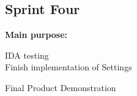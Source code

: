 \subsection{Sprint Four}
\begin{frame}
\textbf{Main purpose:}\\
\begin{center}
IDA testing\\
\pause
{ Finish implementation of Settings}\\
\end{center}
\end{frame}

\begin{frame}
\begin{center}
Final Product Demonstration
\end{center}
\end{frame}